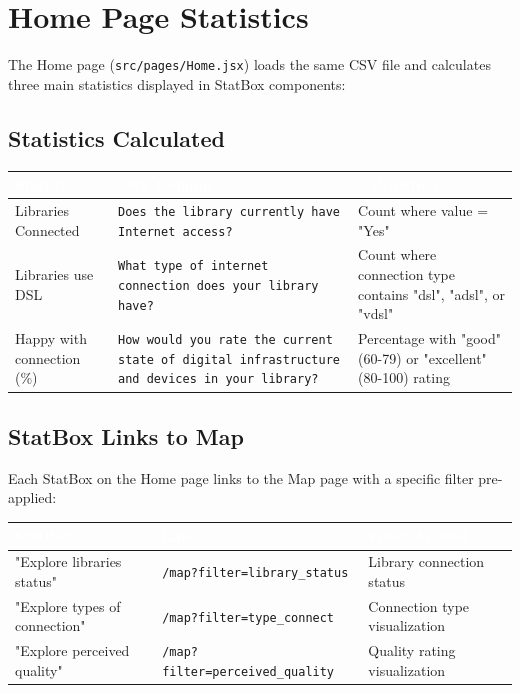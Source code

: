 \documentclass[11pt,a4paper]{article}
\begin{document}
\section{Home Page Statistics}

The Home page (\texttt{src/pages/Home.jsx}) loads the same CSV file and calculates three main statistics displayed in StatBox components:

\subsection{Statistics Calculated}

\begin{longtable}{|p{4cm}|p{5cm}|p{5cm}|}
\hline
\rowcolor{headerblue}\textcolor{white}{\textbf{Statistic}} & \textcolor{white}{\textbf{CSV Column}} & \textcolor{white}{\textbf{Calculation}} \\
\hline
Libraries Connected & \texttt{Does the library currently have Internet access?} & Count where value = "Yes" \\
\hline
Libraries use DSL & \texttt{What type of internet connection does your library have?} & Count where connection type contains "dsl", "adsl", or "vdsl" \\
\hline
Happy with connection (\%) & \texttt{How would you rate the current state of digital infrastructure and devices in your library?} & Percentage with "good" (60-79) or "excellent" (80-100) rating \\
\hline
\end{longtable}

\subsection{StatBox Links to Map}

Each StatBox on the Home page links to the Map page with a specific filter pre-applied:

\begin{longtable}{|p{5cm}|p{5cm}|p{4cm}|}
\hline
\rowcolor{headerblue}\textcolor{white}{\textbf{StatBox}} & \textcolor{white}{\textbf{Link}} & \textcolor{white}{\textbf{Filter Applied}} \\
\hline
"Explore libraries status" & \texttt{/map?filter=library\_status} & Library connection status \\
\hline
"Explore types of connection" & \texttt{/map?filter=type\_connect} & Connection type visualization \\
\hline
"Explore perceived quality" & \texttt{/map?filter=perceived\_quality} & Quality rating visualization \\
\hline
\end{longtable}
\end{document}
